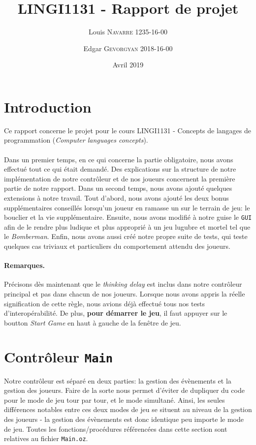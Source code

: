 \documentclass{article}
\title{LINGI1131 - Rapport de projet}
\author{Louis \textsc{Navarre} 1235-16-00 \and Edgar \textsc{Gevorgyan} 2018-16-00}
\date{Avril 2019}
\begin{document}
\maketitle

\section{Introduction}
Ce rapport concerne le projet pour le cours LINGI1131 - Concepts de langages de programmation (\emph{Computer languages concepts}). \\ \\
Dans un premier temps, en ce qui concerne la partie obligatoire, nous avons effectué tout ce qui était demandé. Des explications sur la structure de notre implémentation de notre contrôleur et de nos joueurs concernent la première partie de notre rapport. Dans un second temps, nous avons ajouté quelques extensions à notre travail. Tout d'abord, nous avons ajouté les deux bonus supplémentaires conseillés lorsqu'un joueur en ramasse un sur le terrain de jeu: le bouclier et la vie supplémentaire. Ensuite, nous avons modifié à notre guise le \texttt{GUI} afin de le rendre plus ludique et plus approprié à un jeu lugubre et mortel tel que le \emph{Bomberman}. Enfin, nous avons aussi créé notre propre suite de tests, qui teste quelques cas triviaux et particuliers du comportement attendu des joueurs.
\paragraph{Remarques.}Précisons dès maintenant que le \emph{thinking delay} est inclus dans notre contrôleur principal et pas dans chacun de nos joueurs. Lorsque nous avons appris la réelle signification de cette règle, nous avions déjà effectué tous nos tests d'interopérabilité. De plus, \textbf{pour démarrer le jeu}, il faut appuyer sur le boutton \emph{Start Game} en haut à gauche de la fenêtre de jeu.

\section{Contrôleur \texttt{Main}}
Notre contrôleur est séparé en deux parties: la gestion des évènements et la gestion des joueurs. Faire de la sorte nous permet d'éviter de dupliquer du code pour le mode de jeu tour par tour, et le mode simultané. Ainsi, les seules différences notables entre ces deux modes de jeu se situent au niveau de la gestion des joueurs - la gestion des évènements est donc identique peu importe le mode de jeu. Toutes les fonctions/procédures référencées dans cette section sont relatives au fichier \texttt{Main.oz}.
\end{document}
